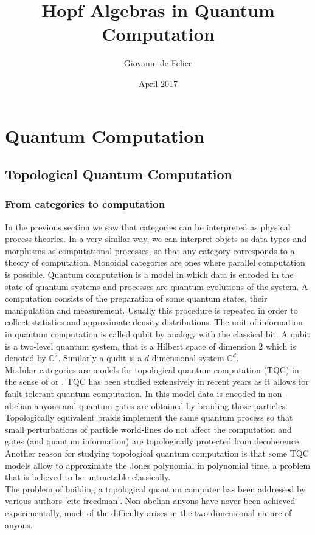 \documentclass{article}
\title{Hopf Algebras in Quantum Computation}
\author{Giovanni de Felice}
\date{April 2017}
\begin{document}
\section{Quantum Computation}

\subsection{Topological Quantum Computation}

\subsubsection{From categories to computation}
In the previous section we saw that categories can be interpreted as physical process theories. In a very similar way, we can interpret objets as data types and morphisms as computational processes, so that any category corresponds to a theory of computation. Monoidal categories are ones where parallel computation is possible. Quantum computation is a model in which data is encoded in the state of quantum systems and processes are quantum evolutions of the system. A computation consists of the preparation of some quantum states, their manipulation and measurement. Usually this procedure is repeated in order to collect statistics and approximate density distributions. The unit of information in quantum computation is called qubit by analogy with the classical bit. A qubit is a two-level quantum system, that is a Hilbert space of dimension $2$ which is denoted by $\mathbb{C}^2$. Similarly a qudit is a $d$ dimensional system $\mathbb{C}^d$.\\
Modular categories are models for topological quantum computation (TQC) in the sense of \cite{Kitaev03} or \cite{Rowell17}. TQC has been studied extensively in recent years as it allows for fault-tolerant quantum computation. In this model data is encoded in non-abelian anyons and quantum gates are obtained by braiding those particles. Topologically equivalent braids implement the same quantum process so that small perturbations of particle world-lines do not affect the computation and gates (and quantum information) are topologically protected from decoherence.
Another reason for studying topological quantum computation is that some TQC models allow to approximate the Jones polynomial in polynomial time, a problem that is believed to be untractable classically.\\
The problem of building a topological quantum computer has been addressed by various authors \cite{Kitaev03} [cite freedman]. Non-abelian anyons have never been achieved experimentally, much of the difficulty arises in the two-dimensional nature of anyons.\\
\end{document}
